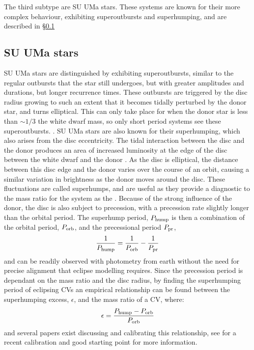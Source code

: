 The third subtype are SU UMa stars. These systems are known for their more complex behaviour, exhibiting superoutbursts and superhumping, and are described in \S\ref{sect:introduction:SU UMa}

\subsection{SU UMa stars}
\label{sect:introduction:SU UMa}

SU UMa stars are distinguished by exhibiting superoutbursts, similar to the regular outbursts that the star still undergoes, but with greater amplitudes and durations, but longer recurrence times. These outbursts are triggered by the disc radius growing to such an extent that it becomes tidally perturbed by the donor star, and turns elliptical. This can only take place for when the donor star is less than $\sim 1/3$ the white dwarf mass, so only short period systems see these superoutbursts. \citep{hellier2001}. 
SU UMa stars are also known for their superhumping, which also arises from the disc eccentricity. The tidal interaction between the disc and the donor produces an area of increased luminosity at the edge of the disc between the white dwarf and the donor \citep{warner1988}. As the disc is elliptical, the distance between this disc edge and the donor varies over the course of an orbit, causing a similar variation in brightness as the donor moves around the disc.
These fluctuations are called superhumps, and are useful as they provide a diagnostic to the mass ratio for the system as the  \citep{Patterson1998, Patterson2001, patterson2005}. 
Because of the strong influence of the donor, the disc is also subject to precession, with a precession rate slightly longer than the orbital period. The superhump period, $P_{\rm hump}$ is then a combination of the orbital period, $P_{\rm orb}$, and the precessional period $P_{\rm pr}$,
\begin{equation}
    \frac{1}{P_{\rm hump}} = \frac{1}{P_{\rm orb}} - \frac{1}{P_{\rm pr}}
\end{equation}
and can be readily observed with photometry from earth without the need for precise alignment that eclipse modelling requires. Since the precession period is dependant on the mass ratio and the disc radius, by finding the superhumping period of eclipsing CVs an empirical relationship can be found between the superhumping excess, $\epsilon$, and the mass ratio of a CV, where:
\begin{equation}
    \epsilon = \frac{P_{\rm hump} - P_{\rm orb}}{P_{\rm orb}}
\end{equation}
and several papers exist discussing and calibrating this relationship, see \citet{McAllister2019} for a recent calibration and good starting point for more information.


